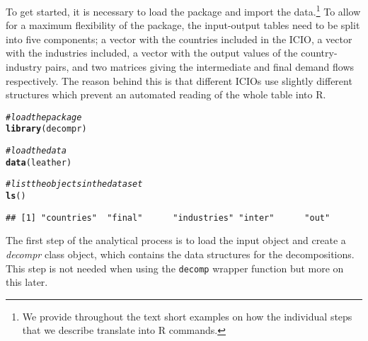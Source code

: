 \documentclass[a4paper,11pt]{article}
\makeatletter
\newcommand{\hlcom}[1]{\textcolor[rgb]{0.678,0.584,0.686}{\textit{#1}}}%
\newcommand{\hlstd}[1]{\textcolor[rgb]{0.345,0.345,0.345}{#1}}%
\newcommand{\hlkwd}[1]{\textcolor[rgb]{0.737,0.353,0.396}{\textbf{#1}}}%
\newenvironment{kframe}{%
 \def\at@end@of@kframe{}%
 \ifinner\ifhmode%
  \def\at@end@of@kframe{\end{minipage}}%
  \begin{minipage}{\columnwidth}%
 \fi\fi%
 \def\FrameCommand##1{\hskip\@totalleftmargin \hskip-\fboxsep
 \colorbox{shadecolor}{##1}\hskip-\fboxsep
     \hskip-\linewidth \hskip-\@totalleftmargin \hskip\columnwidth}%
 \MakeFramed {\advance\hsize-\width
   \@totalleftmargin\z@ \linewidth\hsize
   \@setminipage}}%
 {\par\unskip\endMakeFramed%
 \at@end@of@kframe}
\newenvironment{knitrout}{}{} %
\makeatother
\begin{document}
To get started, it is necessary to load the package and import the data.\footnote{We provide throughout the text short examples on how the individual steps that we describe translate into R commands.} To allow for a maximum flexibility of the package, the input-output tables need to be split into five components; a vector with the countries included in the ICIO, a vector with the industries included, a vector with the output values of the country-industry pairs, and two matrices giving the intermediate and final demand flows respectively. The reason behind this is that different ICIOs use slightly different structures which prevent an automated reading of the whole table into R.

\begin{knitrout}
\color{fgcolor}\begin{kframe}
\begin{alltt}
\hlcom{# load the package}
\hlkwd{library}\hlstd{(decompr)}
\end{alltt}
\end{kframe}
\end{knitrout}

\begin{knitrout}
\color{fgcolor}\begin{kframe}
\begin{alltt}
\hlcom{# load the data}
\hlkwd{data}\hlstd{(leather)}

\hlcom{# list the objects in the data set}
\hlkwd{ls}\hlstd{()}
\end{alltt}
\begin{verbatim}
## [1] "countries"  "final"      "industries" "inter"      "out"
\end{verbatim}
\end{kframe}
\end{knitrout}


The first step of the analytical process is to load the input object and create a \textit{decompr} class object, which contains the data structures for the decompositions. This step is not needed when using the \verb!decomp! wrapper function but more on this later.
\end{document}
